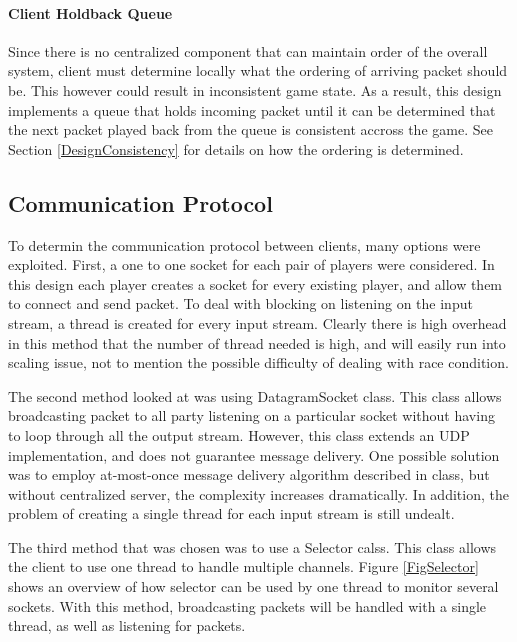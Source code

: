 \paragraph*{Client Holdback Queue}

Since there is no centralized component that can maintain order of the overall system, client must determine locally what the ordering of arriving packet should be. This however could result in inconsistent game state. As a result, this design implements a queue that holds incoming packet until it can be determined that the next packet played back from the queue is consistent accross the game. See Section \ref{DesignConsistency} for details on how the ordering is determined.

\subsection{Communication Protocol}\label{DesignProtocol}

To determin the communication protocol between clients, many options were exploited. First, a one to one socket for each pair of players were considered. In this design each player creates a socket for every existing player, and allow them to connect and send packet. To deal with blocking on listening on the input stream, a thread is created for every input stream. Clearly there is high overhead in this method that the number of thread needed is high, and will easily run into scaling issue, not to mention the possible difficulty of dealing with race condition. 

The second method looked at was using DatagramSocket class. This class allows broadcasting packet to all party listening on a particular socket without having to loop through all the output stream. However, this class extends an UDP implementation, and does not guarantee message delivery. One possible solution was to employ at-most-once message delivery algorithm described in class, but without centralized server, the complexity increases dramatically. In addition, the problem of creating a single thread for each input stream is still undealt.

The third method that was chosen was to use a Selector calss. This class allows the client to use one thread to handle multiple channels. Figure \ref{FigSelector} shows an overview of how selector can be used by one thread to monitor several sockets. With this method, broadcasting packets will be handled with a single thread, as well as listening for packets.

